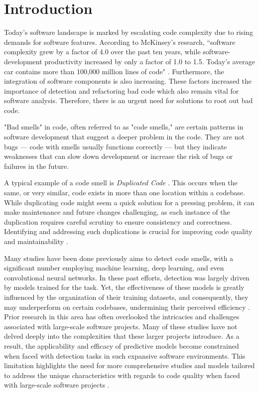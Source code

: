 \section{Introduction}
\label{sec:intro}


Today's software landscape is marked by escalating code complexity due to rising demands for software features. According to McKinsey's research, “software complexity grew by a factor of 4.0 over the past ten years, while 
software-development productivity increased by only a factor of 1.0 to 1.5. Today's average car contains more than 100,000 million lines of code" \cite{Burkacky_Deichmann_Frank_Hepp_Rocha_2021}. Furthermore, the integration of software components is also increasing. These factors increased the importance of detection and refactoring bad code which also remain vital for software analysis. Therefore, there is an urgent need for solutions to root out bad code.



"Bad smells" in code, often referred to as "code smells," are certain patterns in software development that suggest a deeper problem in the code. They are not bugs — code with smells usually functions correctly — but they indicate weaknesses that can slow down development or increase the risk of bugs or failures in the future.

A typical example of a code smell is \textit{Duplicated Code} \cite{Martin_2018}. This occurs when the same, or very similar, code exists in more than one location within a codebase. While duplicating code might seem a quick solution for a pressing problem, it can make maintenance and future changes challenging, as each instance of the duplication requires careful scrutiny to ensure consistency and correctness. Identifying and addressing such duplications is crucial for improving code quality and maintainability \cite{Martin_2018}.

Many studies have been done previously aims to detect code smells, with a significant number employing machine learning, deep learning, and even convolutional neural networks. In these past efforts, detection was largely driven by models trained for the task. Yet, the effectiveness of these models is greatly influenced by the organization of their training datasets, and consequently, they may underperform on certain codebases, undermining their perceived efficiency \cite{Nucci_Dario_Palomba_2018}. Prior research in this area has often overlooked the intricacies and challenges associated with large-scale software projects. Many of these studies have not delved deeply into the complexities that these larger projects introduce. As a result, the applicability and efficacy of predictive models become constrained when faced with detection tasks in such expansive software environments. This limitation highlights the need for more comprehensive studies and models tailored to address the unique characteristics with regards to code quality when faced with large-scale software projects \cite{Menshawy_Yousef_2021}.



